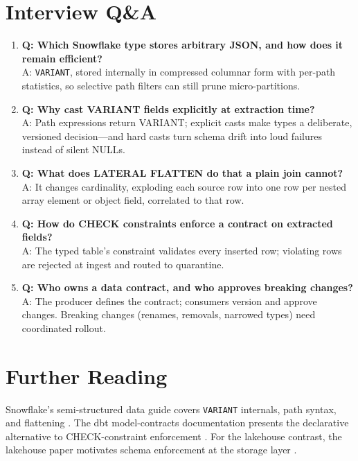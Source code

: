 \section{Interview Q\&A}
\begin{enumerate}
    \item \textbf{Q: Which Snowflake type stores arbitrary JSON, and how does it remain efficient?}\\
    A: \texttt{VARIANT}, stored internally in compressed columnar form with per-path statistics, so selective path filters can still prune micro-partitions.
    \item \textbf{Q: Why cast VARIANT fields explicitly at extraction time?}\\
    A: Path expressions return VARIANT; explicit casts make types a deliberate, versioned decision---and hard casts turn schema drift into loud failures instead of silent NULLs.
    \item \textbf{Q: What does LATERAL FLATTEN do that a plain join cannot?}\\
    A: It changes cardinality, exploding each source row into one row per nested array element or object field, correlated to that row.
    \item \textbf{Q: How do CHECK constraints enforce a contract on extracted fields?}\\
    A: The typed table's constraint validates every inserted row; violating rows are rejected at ingest and routed to quarantine.
    \item \textbf{Q: Who owns a data contract, and who approves breaking changes?}\\
    A: The producer defines the contract; consumers version and approve changes. Breaking changes (renames, removals, narrowed types) need coordinated rollout.
\end{enumerate}

\section{Further Reading}
Snowflake's semi-structured data guide covers \texttt{VARIANT} internals, path syntax, and flattening \cite{snowflakeSemiStructuredDocs}. The dbt model-contracts documentation presents the declarative alternative to CHECK-constraint enforcement \cite{dbtContractsDocs}. For the lakehouse contrast, the lakehouse paper motivates schema enforcement at the storage layer \cite{armbrust2021lakehouse}.

